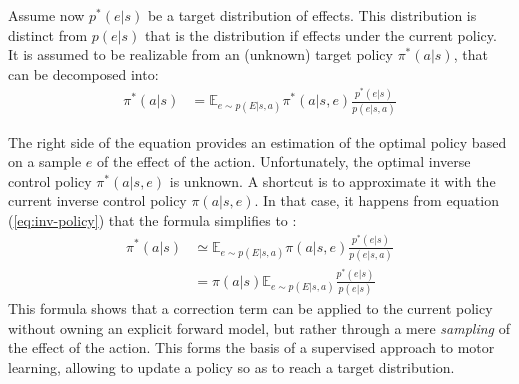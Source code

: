 \documentclass[runningheads]{llncs}
\begin{document}
%

Assume now $p^*(e|s)$ be a target distribution of effects. This distribution is distinct from  $p(e|s)$ that is the distribution if effects under the current policy. It is assumed to be realizable from an (unknown) target policy $\pi^*(a|s)$, that can be decomposed into:
\begin{align}
\pi^*(a|s) &= \mathbb{E}_{e\sim p(E|s,a)} \pi^*(a|s,e)\frac{p^*(e|s)}{p(e|s,a)}
\end{align}

The right side of the equation provides an estimation of the optimal policy based on a sample $e$ of the effect of the action. Unfortunately, the optimal inverse control policy $\pi^*(a|s,e)$ is unknown. A shortcut is to approximate it with the current inverse control policy $\pi(a|s,e)$.
In that case, it happens from equation (\ref{eq:inv-policy}) that the formula simplifies to :
\begin{align}\label{eq:bayesian-update}
\pi^*(a|s) &\simeq \mathbb{E}_{e\sim p(E|s,a)} \pi(a|s,e)\frac{p^*(e|s)}{p(e|s,a)}\\
&= \pi(a|s) \mathbb{E}_{e\sim p(E|s,a)} \frac{p^*(e|s)}{p(e|s)}
\end{align}
This formula shows that a correction term can be applied to the current policy without owning an explicit forward model, but rather through a mere \emph{sampling} of the effect of the action. This forms the basis of a supervised approach to motor learning, allowing to update a policy so as to reach a target distribution. 

%
%
%
\end{document}
